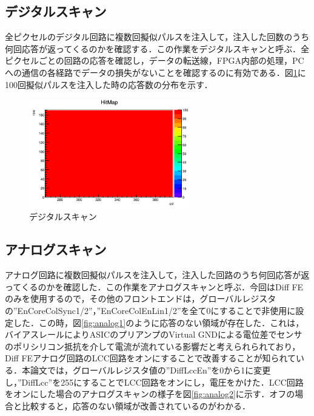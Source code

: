 \subsection{デジタルスキャン}
全ピクセルのデジタル回路に複数回擬似パルスを注入して，注入した回数のうち何回応答が返ってくるのかを確認する．この作業をデジタルスキャンと呼ぶ．全ピクセルごとの回路の応答を確認し，データの転送線，FPGA内部の処理，PCへの通信の各経路でデータの損失がないことを確認するのに有効である．図\ref{fig:digital}に100回擬似パルスを注入した時の応答数の分布を示す．
\begin{figure}[h]
  \centering
  \includegraphics[width=7cm]{./figure/DigitalScan.png}
  \caption{デジタルスキャン}
  \label{fig:digital}
\end{figure}


\subsection{アナログスキャン}
アナログ回路に複数回擬似パルスを注入して，注入した回路のうち何回応答が返ってくるのかを確認した．この作業をアナログスキャンと呼ぶ．今回はDiff FEのみを使用するので，その他のフロントエンドは，グローバルレジスタの''EnCoreColSync1/2''，''EnCoreColEnLin1/2''を全て0にすることで非使用に設定した．この時，図\ref{fig:analog1}のように応答のない領域が存在した．これは，バイアスレールによりASICのプリアンプのVirtual GNDによる電位差でセンサのポリシリコン抵抗を介して電流が流れている影響だと考えられられており，Diff FEアナログ回路のLCC回路をオンにすることで改善することが知られている．本論文では，グローバルレジスタ値の''DiffLccEn''を0から1に変更し，''DiffLcc''を255にすることでLCC回路をオンにし，電圧をかけた．LCC回路をオンにした場合のアナログスキャンの様子を図\ref{fig:analog2}に示す．オフの場合と比較すると，応答のない領域が改善されているのがわかる．

